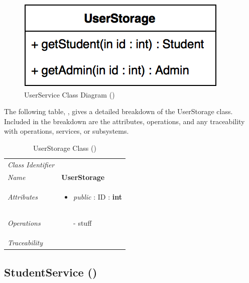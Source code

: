 \documentclass[12pt,letterpaper]{article}
\begin{document}
\begin{figure}[H]
	\centering{}
	\includegraphics[scale=0.35]{imgs/d3/interfaces/user.png}
	\caption{UserService Class Diagram ()}
\end{figure}

The following table, , gives a detailed breakdown of the UserStorage class. Included in the breakdown are the attributes, operations, and any traceability with operations, services, or subsystems.

\begin{table}[H]
    \caption{UserStorage Class ()} 
	\begin{tabu} to 
		\toprule
		Class Identifier &  \\
		Name & {\bf UserStorage} \\
		Attributes & 
		\begin{minipage}[t]{\linewidth}
		    \begin{itemize}
		        \item \textit{public} : ID : \bf{int}
			\end{itemize}
	    \end{minipage} \\

		Operations &
		\begin{minipage}[t]{\linewidth}
			\begin{enumerate}
			    \item[-] stuff
	        \end{enumerate}
	    \end{minipage} \\
	    	Traceability & \\
		\toprule
	\end{tabu}
\end{table}

\subsection{StudentService ()}
\end{document}
